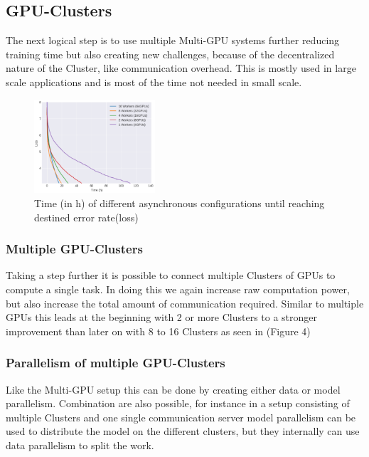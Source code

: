 \documentclass[conference]{IEEEtran}
\begin{document}
\subsection{GPU-Clusters}

The next logical step is to use multiple Multi-GPU systems further reducing training time but also creating new challenges, because of the decentralized nature of the Cluster, like communication overhead.  This is mostly used in large scale applications and is most of the time not needed in small scale.

\begin{figure}
\centering
\includegraphics[width=0.4\textwidth]{gpu_cluster_perf_win.png}
\caption{Time (in h) of different asynchronous configurations until reaching destined error rate(loss)\cite{sastre2017scalability}}
\label{fig_cl_gpus}
\end{figure}

\subsubsection{Multiple GPU-Clusters}
Taking a step further it is possible to connect multiple Clusters of GPUs to compute a single task. In doing this we again increase raw computation power, but also increase the total amount of communication required. Similar to multiple GPUs this leads at the beginning with 2 or more Clusters to a stronger improvement than later on with 8 to 16 Clusters as seen in (Figure 4)

\subsubsection{Parallelism of multiple GPU-Clusters}
Like the Multi-GPU setup this can be done by creating either data or model parallelism. Combination are also possible, for instance in a setup consisting of multiple Clusters and one single communication server model parallelism can be used to distribute the model on the different clusters, but they internally can use data parallelism to split the work\cite{wang2016deep}.
\end{document}
